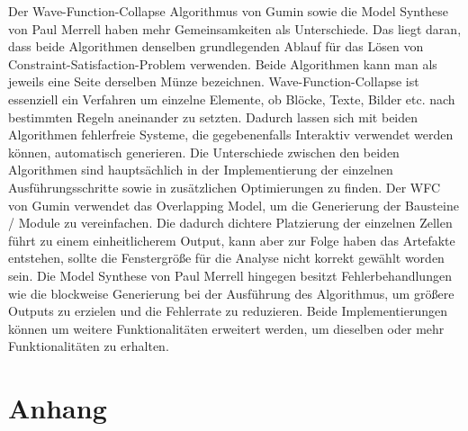 \documentclass[12pt, a4paper,twoside,openright]{report} %
\begin{document}
Der Wave-Function-Collapse Algorithmus von Gumin sowie die Model Synthese von Paul Merrell haben mehr Gemeinsamkeiten als Unterschiede.
Das liegt daran, dass beide Algorithmen denselben grundlegenden Ablauf für das Lösen von Constraint-Satisfaction-Problem verwenden.
Beide Algorithmen kann man als jeweils eine Seite derselben Münze bezeichnen.
Wave-Function-Collapse ist essenziell ein Verfahren um einzelne Elemente, ob Blöcke, Texte, Bilder etc. nach bestimmten Regeln aneinander zu setzten.
Dadurch lassen sich mit beiden Algorithmen fehlerfreie Systeme, die gegebenenfalls Interaktiv verwendet werden können, automatisch generieren.
Die Unterschiede zwischen den beiden Algorithmen sind hauptsächlich in der Implementierung der einzelnen Ausführungsschritte sowie in zusätzlichen Optimierungen zu finden.
Der WFC von Gumin verwendet das Overlapping Model, um die Generierung der Bausteine / Module zu vereinfachen.
Die dadurch dichtere Platzierung der einzelnen Zellen führt zu einem einheitlicherem Output, kann aber zur Folge haben das Artefakte entstehen,
sollte die Fenstergröße für die Analyse nicht korrekt gewählt worden sein.
Die Model Synthese von Paul Merrell hingegen besitzt Fehlerbehandlungen wie die blockweise Generierung bei der Ausführung des Algorithmus, um größere Outputs zu erzielen und die
Fehlerrate zu reduzieren.
Beide Implementierungen können um weitere Funktionalitäten erweitert werden, um dieselben oder mehr Funktionalitäten zu erhalten.

\printbibliography

\chapter{Anhang}
\end{document}
